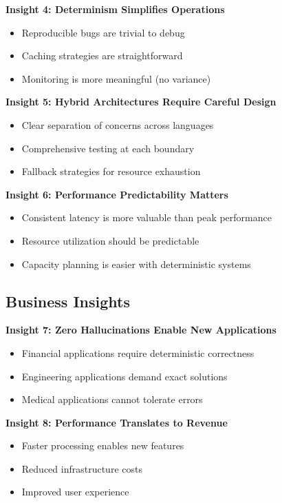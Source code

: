 \documentclass{article}
\begin{document}
\textbf{Insight 4: Determinism Simplifies Operations}
\begin{itemize}
    \item Reproducible bugs are trivial to debug
    \item Caching strategies are straightforward
    \item Monitoring is more meaningful (no variance)
\end{itemize}

\textbf{Insight 5: Hybrid Architectures Require Careful Design}
\begin{itemize}
    \item Clear separation of concerns across languages
    \item Comprehensive testing at each boundary
    \item Fallback strategies for resource exhaustion
\end{itemize}

\textbf{Insight 6: Performance Predictability Matters}
\begin{itemize}
    \item Consistent latency is more valuable than peak performance
    \item Resource utilization should be predictable
    \item Capacity planning is easier with deterministic systems
\end{itemize}

\subsection{Business Insights}

\textbf{Insight 7: Zero Hallucinations Enable New Applications}
\begin{itemize}
    \item Financial applications require deterministic correctness
    \item Engineering applications demand exact solutions
    \item Medical applications cannot tolerate errors
\end{itemize}

\textbf{Insight 8: Performance Translates to Revenue}
\begin{itemize}
    \item Faster processing enables new features
    \item Reduced infrastructure costs
    \item Improved user experience
\end{itemize}
\end{document}
